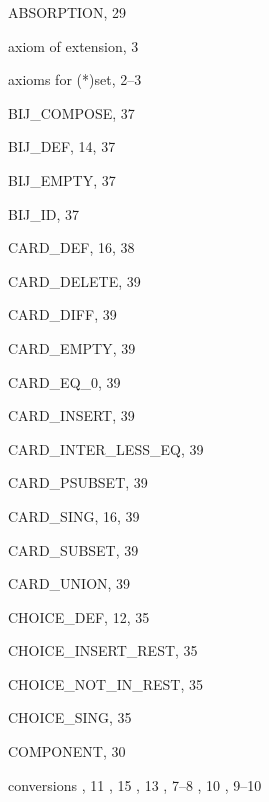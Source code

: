 \begin{theindex}

  \item {\ptt ABSORPTION}, 29
  \item axiom of extension, 3
  \item axioms for {\ptt (*)set}, 2--3

  \indexspace

  \item {\ptt BIJ\_COMPOSE}, 37
  \item {\ptt BIJ\_DEF}, 14, 37
  \item {\ptt BIJ\_EMPTY}, 37
  \item {\ptt BIJ\_ID}, 37

  \indexspace

  \item {\ptt CARD\_DEF}, 16, 38
  \item {\ptt CARD\_DELETE}, 39
  \item {\ptt CARD\_DIFF}, 39
  \item {\ptt CARD\_EMPTY}, 39
  \item {\ptt CARD\_EQ\_0}, 39
  \item {\ptt CARD\_INSERT}, 39
  \item {\ptt CARD\_INTER\_LESS\_EQ}, 39
  \item {\ptt CARD\_PSUBSET}, 39
  \item {\ptt CARD\_SING}, 16, 39
  \item {\ptt CARD\_SUBSET}, 39
  \item {\ptt CARD\_UNION}, 39
  \item {\ptt CHOICE\_DEF}, 12, 35
  \item {\ptt CHOICE\_INSERT\_REST}, 35
  \item {\ptt CHOICE\_NOT\_IN\_REST}, 35
  \item {\ptt CHOICE\_SING}, 35
  \item {\ptt COMPONENT}, 30
  \item conversions
    , 11
    , 15
    , 13
    , 7--8
    , 10
    , 9--10

  \indexspace


\end{theindex}
